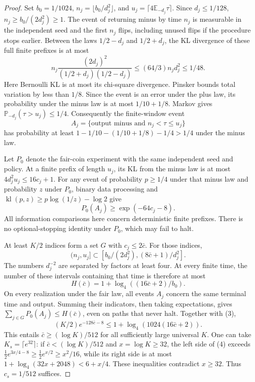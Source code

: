 \documentclass[11pt]{article}
\newcommand{\E}{\mathbb E}
\newcommand{\Pp}{\mathbb P}
\begin{document}
\begin{proof}
Set $b_0=1/1024$, $n_j=\lfloor b_0/d_j^2\rfloor$, and
$u_j=\lceil4\E_{-d_j}\tau\rceil$. Since $d_j\le1/128$,
$n_j\ge b_0/(2d_j^2)\ge1$.
The event of returning minus by time $n_j$ is measurable in the independent
seed and the first $n_j$ flips, including unused flips if the procedure stops
earlier. Between the laws $1/2-d_j$ and $1/2+d_j$, the KL divergence of these
full finite prefixes is at most
\[
 n_j\frac{(2d_j)^2}{(1/2+d_j)(1/2-d_j)}
 \le(64/3)n_jd_j^2\le1/48.
\]
Here Bernoulli KL is at most its chi-square divergence. Pinsker bounds total
variation by less than $1/8$. Since the event is an error under the plus law,
its probability under the minus law is at most $1/10+1/8$.
Markov gives $\Pp_{-d_j}(\tau>u_j)\le1/4$.
Consequently the finite-window event
\[
 A_j=\{\text{output minus and } n_j<\tau\le u_j\}
\]
has probability at least $1-1/10-(1/10+1/8)-1/4>1/4$ under the minus law.

Let $P_0$ denote the fair-coin experiment with the same independent seed and
policy. At a finite prefix of length $u_j$, its KL from the minus law is at
most $4d_j^2u_j\le16c_j+1$. For any event of probability $p\ge1/4$ under
that minus law and probability $z$ under $P_0$, binary data processing and
$\operatorname{kl}(p,z)\ge p\log(1/z)-\log2$ give
\[
 P_0(A_j)\ge\exp(-64c_j-8).                              \tag{3}
\]
All information comparisons here concern deterministic finite prefixes.
There is no optional-stopping identity under $P_0$, which may fail to halt.

At least $K/2$ indices form a set $G$ with $c_j\le2\bar c$. For those indices,
\[
 (n_j,u_j]\subset
 [b_0/(2d_j^2),(8\bar c+1)/d_j^2].
\]
The numbers $d_j^{-2}$ are separated by factors at least four. At every
finite time, the number of these intervals containing that time is therefore
at most
\[
 H(\bar c)=1+\log_4((16\bar c+2)/b_0).
\]
On every realization under the fair law, all events $A_j$ concern the same
terminal time and output. Summing their indicators, then taking expectations,
gives $\sum_{j\in G}P_0(A_j)\le H(\bar c)$, even on paths that never halt.
Together with (3),
\[
 (K/2)e^{-128\bar c-8}
 \le1+\log_4(1024(16\bar c+2)).                          \tag{4}
\]
This entails $\bar c\ge(\log K)/512$ for all sufficiently large universal
$K$. One can take $K_s=\lceil e^{32}\rceil$: if
$\bar c<(\log K)/512$ and $x=\log K\ge32$, the left side of (4) exceeds
$\tfrac12e^{3x/4-8}\ge\tfrac12e^{x/2}\ge x^2/16$,
while its right side is at most $1+\log_4(32x+2048)<6+x/4$.
These inequalities contradict $x\ge32$. Thus $c_s=1/512$ suffices.
\end{proof}
\end{document}
